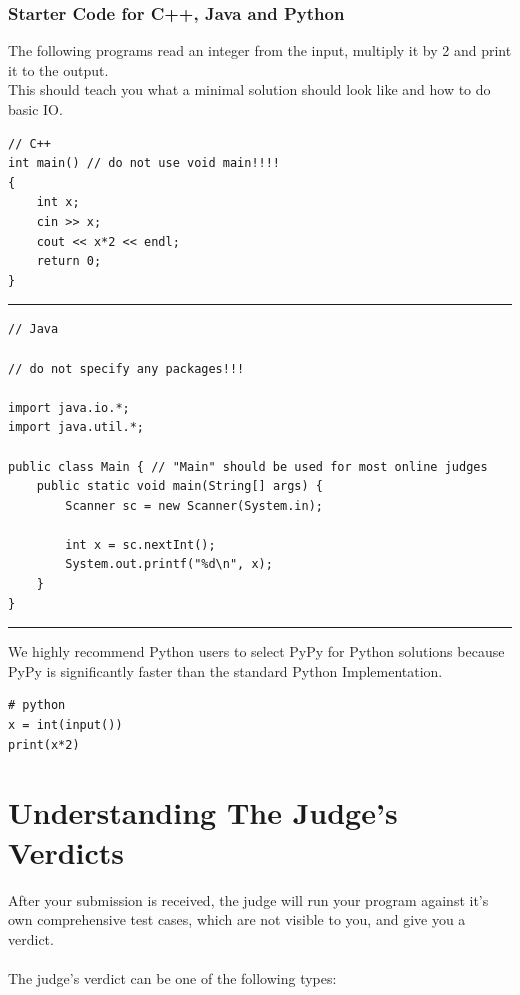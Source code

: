 \documentclass {article}
\begin{document}
\subsubsection{Starter Code for C++, Java and Python}
The following programs read an integer from the input, multiply it by 2
and print it to the output.\\
This should teach you what a minimal solution should look like
and how to do basic IO.\\
\begin{verbatim}
// C++
int main() // do not use void main!!!!
{
    int x;
    cin >> x;
    cout << x*2 << endl;
    return 0;
}
\end{verbatim}
\hrule
\begin{verbatim}
// Java

// do not specify any packages!!!

import java.io.*;
import java.util.*;

public class Main { // "Main" should be used for most online judges
    public static void main(String[] args) {
        Scanner sc = new Scanner(System.in);

        int x = sc.nextInt();
        System.out.printf("%d\n", x);
    }
}
\end{verbatim}
\hrule

\vspace{2pt}
We highly recommend Python users to select PyPy for Python solutions 
because PyPy is  significantly faster than the standard Python Implementation.

\begin{verbatim}
# python
x = int(input())
print(x*2)
\end{verbatim}

\newpage
\section{Understanding The Judge's Verdicts}
After your submission is received, the judge will run your
program against it's own comprehensive test cases, which are not 
visible to you, and give you a verdict.\\\\
The judge's verdict can be one of the following types:
\end{document}
